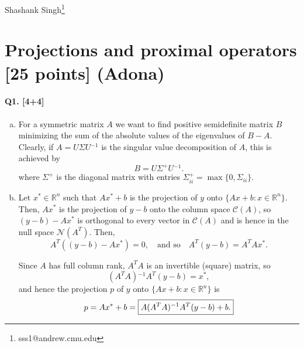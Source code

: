 \documentclass[11pt]{article}
\newcommand{\R}{\mathbb{R}}                 %
\newcommand{\Col}{\mathcal{C}}              %
\newcommand{\Nul}{\mathcal{N}}              %
\newcommand{\inv}{{^{-1}}}                  %
\begin{document}
Shashank Singh\footnote{sss1@andrew.cmu.edu}
\setcounter{section}{1}
\section{Projections and proximal operators [25 points] (Adona)}
\paragraph{Q1. [4+4]} 
\begin{enumerate}[a)]
\item For a symmetric matrix $A$ we want to find positive semidefinite matrix
$B$ minimizing the sum of the absolute values of the eigenvalues of $B - A$.
Clearly, if $A = U\Sigma U\inv$ is the singular value decomposition of $A$,
this is achieved by
\[B = U\Sigma^+U\inv.\]
where $\Sigma^+$ is the diagonal matrix with entries
$\Sigma^+_{ii} = \max\{0,\Sigma_{ii}\}$.

\item Let $x^* \in \R^n$ such that $Ax^* + b$ is the projection of $y$ onto
$\{Ax + b : x \in \R^n\}$. Then, $Ax^*$ is the projection of $y - b$ onto the
column space $\Col(A)$, so $(y - b) - Ax^*$ is orthogonal to every vector in
$\Col(A)$ and is hence in the null space $\Nul(A^T)$. Then,
\[A^T((y - b) - Ax^*) = 0, \quad \mbox{and so} \quad A^T(y - b) = A^TAx^*. \]

Since $A$ has full column rank, $A^TA$ is an invertible (square) matrix, so
\[(A^TA)\inv A^T(y - b) = x^*,\]
and hence the projection $p$ of $y$ onto $\{Ax + b : x \in \R^n\}$ is
\[p = Ax^* + b = \mbox{\fbox{$\displaystyle A(A^TA)\inv A^T(y - b) + b$.}}\]
\end{enumerate}
\end{document}
